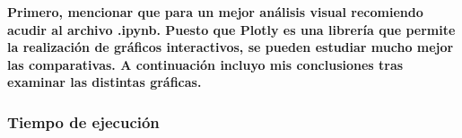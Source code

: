 \documentclass[10pt, a4paper]{article}
\theoremstyle{theorem-style}
\theoremstyle{theorem-style}
\theoremstyle{theorem2-style}
\theoremstyle{definition-style}
\theoremstyle{remark-style}
\theoremstyle{example-style}
\theoremstyle{definition-style}
\theoremstyle{remark-style}
\theoremstyle{remark-style}
\begin{document}
\begin{tcolorbox}
\textbf{Primero, mencionar que para un mejor análisis visual recomiendo acudir al archivo .ipynb. Puesto que Plotly es una librería que permite la realización de gráficos interactivos, se pueden estudiar mucho mejor las comparativas. A continuación incluyo mis conclusiones tras examinar las distintas gráficas.}
\end{tcolorbox}

\subsubsection{Tiempo de ejecución}
\end{document}
